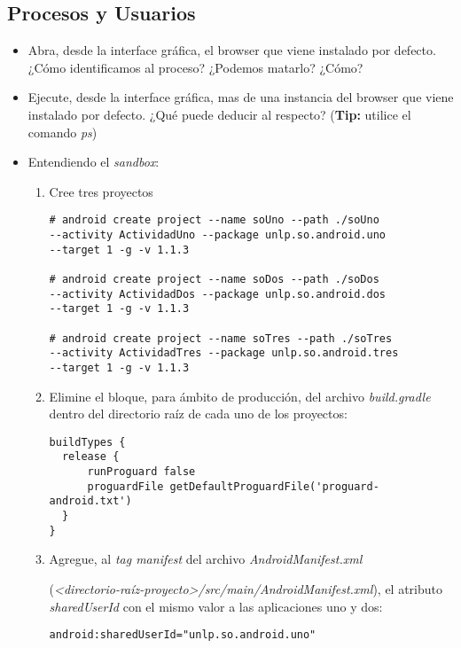 \subsection{Procesos y Usuarios}
\begin{itemize}
    \item Abra, desde la interface gráfica, el browser que viene instalado por defecto. ¿Cómo identificamos al proceso? ¿Podemos matarlo? ¿Cómo?
    
    \item Ejecute, desde la interface gráfica, mas de una instancia del browser que viene instalado por defecto. ¿Qué puede deducir al respecto? (\textbf{Tip:} utilice el comando \textit{ps})
    
    \item Entendiendo el \textit{sandbox}:
    \begin{enumerate}
	  \item Cree tres proyectos
	  \begin{lstlisting}
# android create project --name soUno --path ./soUno 
--activity ActividadUno --package unlp.so.android.uno 
--target 1 -g -v 1.1.3

# android create project --name soDos --path ./soDos 
--activity ActividadDos --package unlp.so.android.dos 
--target 1 -g -v 1.1.3

# android create project --name soTres --path ./soTres 
--activity ActividadTres --package unlp.so.android.tres 
--target 1 -g -v 1.1.3
	  \end{lstlisting}
	  
	  \item Elimine el bloque, para ámbito de producción, del archivo \textit{build.gradle} dentro del directorio raíz de cada uno de los proyectos:
	  \begin{lstlisting}
buildTypes {
  release {
      runProguard false
      proguardFile getDefaultProguardFile('proguard-android.txt')
  }
}
	  \end{lstlisting}
	  
	  \item Agregue, al \textit{tag manifest} del archivo \textit{AndroidManifest.xml} 
	  
	  (\emph{<directorio-raíz-proyecto>/src/main/AndroidManifest.xml}), el atributo \textit{sharedUserId} con el mismo valor a las aplicaciones uno y dos:
	  \begin{lstlisting}
android:sharedUserId="unlp.so.android.uno"
	  \end{lstlisting}
	  

\end{enumerate}
\end{itemize}
